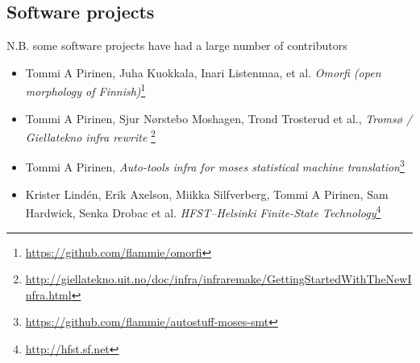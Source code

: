 \documentclass[a4paper]{article}
\begin{document}
\subsection{Software projects}

N.B. some software projects have had a large number of contributors

\begin{itemize}
\item Tommi A Pirinen, Juha Kuokkala, Inari Listenmaa, et al.\textit{ Omorfi (open morphology of Finnish)}\footnote{\url{https://github.com/flammie/omorfi}}
\item Tommi A Pirinen, Sjur Nørstebo Moshagen, Trond Trosterud et al., \textit{Tromsø / Giellatekno infra rewrite} \footnote{\url{http://giellatekno.uit.no/doc/infra/infraremake/GettingStartedWithTheNewInfra.html}}
\item Tommi A Pirinen, \textit{Auto-tools infra for moses statistical machine translation}\footnote{\url{https://github.com/flammie/autostuff-moses-smt}}
\item Krister Lindén, Erik Axelson, Miikka Silfverberg, Tommi A Pirinen, Sam Hardwick, Senka Drobac et al. \textit{HFST–Helsinki Finite-State Technology}\footnote{\url{http://hfst.sf.net}}
\end{itemize}
\end{document}
